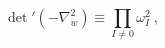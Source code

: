 \begin{equation}
  {\det}'   \left( -\nabla_w^2\right) \equiv \prod_{I\neq 0} \omega^2_I\ ,
\label{det}
\end{equation}


